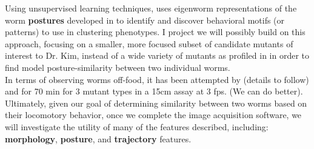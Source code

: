 \documentclass[main.tex]{subfiles}
\begin{document}
Using unsupervised learning techniques, \cite{brown2013} uses eigenworm representations of the worm \textbf{postures} developed in \cite{stephens2008} to identify and discover behavioral motifs (or patterns) to use in clustering phenotypes. I project we will possibly build on this approach, focusing on a smaller, more focused subset of candidate mutants of interest to Dr. Kim, instead of a wide variety of mutants as profiled in \cite{yemini2013} in order to find model posture-similarity between two individual worms. \\ 

In terms of observing worms off-food, it has been attempted by \cite{kim2011} (details to follow) and \cite{hoshi2006} for 70 min for 3 mutant types in a 15cm assay at 3 fps. (We can do better).\\

Ultimately, given our goal of determining similarity between two worms based on their locomotory behavior, once we complete the image acquisition software, we will investigate the utility of many of the features described, including: \textbf{morphology}, \textbf{posture},  and \textbf{trajectory} features. \\
\end{document}

